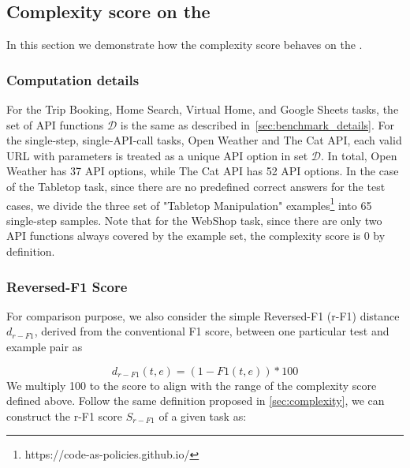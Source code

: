
\subsection{Complexity score on the \snact}
In this section we demonstrate how the complexity score behaves on the \snact. 

\subsubsection{Computation details}
For the Trip Booking, Home Search, Virtual Home, and Google Sheets tasks, the set of API functions $\mathcal{D}$ is the same as described in~\cref{sec:benchmark_details}. For the single-step, single-API-call tasks, Open Weather and The Cat API, each valid URL with parameters is treated as a unique API option in set $\mathcal{D}$. In total, Open Weather has 37 API options, while The Cat API has 52 API options. In the case of the Tabletop task, since there are no predefined correct answers for the test cases, we divide the three set of "Tabletop Manipulation" examples\footnote{https://code-as-policies.github.io/} into 65 single-step samples. Note that for the WebShop task, since there are only two API functions always covered by the example set, the complexity score is 0 by definition. 

\subsubsection{Reversed-F1 Score}
For comparison purpose, we also consider the simple Reversed-F1 (r-F1) distance $d_{r-F1}$, derived from the conventional F1 score\cite{davis2006relationship}, between one particular test and example pair as

\begin{equation}
    d_{r-F1}(t, e) = (1-F1(t,e)) *100
\end{equation}
We multiply 100 to the score to align with the range of the complexity score defined above. Follow the same definition proposed in \cref{sec:complexity}, we can construct the r-F1 score $S_{r-F1}$ of a given task as:

